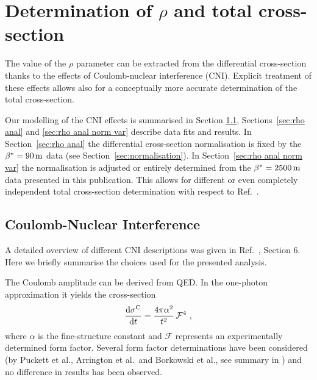 \section{Determination of $\rho$ and total cross-section}
\label{sec:rho}

The value of the $\rho$ parameter can be extracted from the differential cross-section thanks to the effects of Coulomb-nuclear interference (CNI). Explicit treatment of these effects allows also for a conceptually more accurate determination of the total cross-section. 

Our modelling of the CNI effects is summarised in Section \ref{sec:rho cni}, Sections~\ref{sec:rho anal} and \ref{sec:rho anal norm var} describe data fits and results. In Section~\ref{sec:rho anal} the differential cross-section normalisation is fixed by the $\beta^* = 90\,{\rm m}$ data \cite{totem-13tev-90m} (see Section~\ref{sec:normalisation}). In Section~\ref{sec:rho anal norm var} the normalisation is adjusted or entirely determined from the $\beta^* = 2500\,{\rm m}$ data presented in this publication. This allows for different or even completely independent total cross-section determination with respect to Ref.~\cite{totem-13tev-90m}.



\subsection{Coulomb-Nuclear Interference}
\label{sec:rho cni}

A detailed overview of different CNI descriptions was given in Ref.~\cite{totem-8tev-1km}, Section 6. Here we briefly summarise the choices used for the presented analysis.

The Coulomb amplitude can be derived from QED. In the one-photon approximation it yields the cross-section
\begin{equation}
\label{eq:coul cs}
	{{\rm d}\sigma^{\rm C}\over {\rm d}t} = {4\pi\alpha^2\over t^2}\,{\mathcal{F}}^4\ ,
\end{equation}
where $\alpha$ is the fine-structure constant and $\mathcal{F}$ represents an experimentally determined form factor. Several form factor determinations have been considered (by Puckett et al., Arrington et al.~and Borkowski et al., see summary in \cite{elegent}) and no difference in results has been observed.

